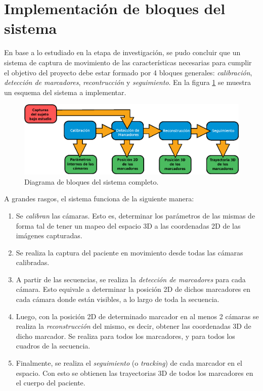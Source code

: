 \section{Implementación de bloques del sistema}
\label{sec:implementacion_bloques_sistema}


En base a lo estudiado en la etapa de investigación, se pudo concluir que un sistema de captura de movimiento de las características necesarias para cumplir el objetivo del proyecto debe estar formado por 4 bloques generales: \emph{calibración}, \emph{detección de marcadores}, \emph{recontrucción} y \emph{seguimiento}. En la figura \ref{bloquesSist} se muestra un esquema del sistema a implementar.

\begin{figure}[H]
\begin{center}
\includegraphics[scale=0.8]{img/Sistema_completo/Diagrama_de_bloques.eps}
\end{center}
\caption{Diagrama de bloques del sistema completo.}
\label{bloquesSist}
\end{figure}

A grandes rasgos, el sistema funciona de la siguiente manera:

\begin{enumerate}
	\item Se \emph{calibran} las cámaras. Esto es, determinar los parámetros de las mismas de forma tal de tener un mapeo del espacio 3D a las coordenadas 2D de las imágenes capturadas.
	\item Se realiza la captura del paciente en movimiento desde todas las cámaras calibradas.
	\item A partir de las secuencias, se realiza la \emph{detección de marcadores} para cada cámara. Esto equivale a determinar la posición 2D de dichos marcadores en cada cámara donde están visibles, a lo largo de toda la secuencia.
	\item Luego, con la posición 2D de determinado marcador en al menos 2 cámaras se realiza la \emph{reconstrucción} del mismo, es decir, obtener las coordenadas 3D de dicho marcador. Se realiza para todos los marcadores, y para todos los cuadros de la secuencia.
	\item Finalmente, se realiza el \emph{seguimiento} (o \emph{tracking}) de cada marcador en el espacio. Con esto se obtienen las trayectorias 3D de todos los marcadores en el cuerpo del paciente.
\end{enumerate}

